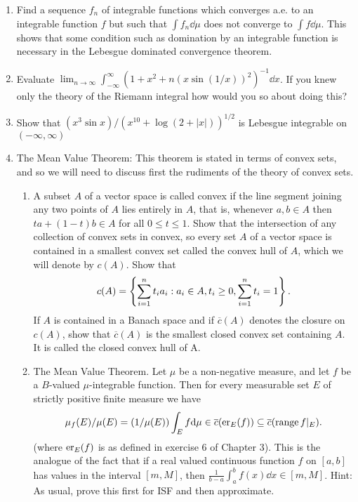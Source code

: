 \begin{enumerate}[label=\arabic*)]
\item Find a sequence $f_n$ of integrable functions which converges a.e. to an integrable function $f$ but such that $\int f_n\dd\mu$ does not converge to $\int f\dd\mu$. This shows that some condition such as domination by an integrable function is necessary in the Lebesgue dominated convergence theorem.

\item Evaluate $\lim_{n\to\infty}\int_{-\infty}^\infty(1+x^2+n(x\sin(1/x))^2)^{-1}\dd x$. If you knew only the theory of the Riemann integral how would you so about doing this?

\item Show that $(x^3 \sin x)/(x^{10}+\log(2+|x|))^{1/2}$ is Lebesgue integrable on $(-\infty,\infty)$

\item The Mean Value Theorem: This theorem is stated in terms of convex sets, and so we will need to discuss first the rudiments of the theory of convex sets.
\begin{enumerate}[label=\alph*)]
    \item A subset $A$ of a vector space is called convex if the line segment joining any two points of $A$ lies entirely in $A$, that is, whenever $a, b \in A$ then $ta+(1-t)b \in A$ for all $0\leq t\leq1$. Show that the intersection of any collection of convex sets in convex, so every set $A$ of a vector space is contained in a smallest convex set called the convex hull of $A$, which we will denote by $c(A)$. Show that $$c(A)=\brc{\sum_{i=1}^nt_ia_i:a_i \in A,t_i\geq0,\sum_{i=1}^nt_i=1}.$$ If $A$ is contained in a Banach space and if $\overline{c}(A)$ denotes the closure on $c(A)$, show that $\overline{c}(A)$ is the smallest closed convex set containing $A$. It is called the closed convex hull of A.
    
    \item The Mean Value Theorem. Let $\mu$ be a non-negative measure, and let $f$ be a $B$-valued $\mu$-integrable function. Then for every measurable set $E$ of strictly positive finite measure we have $$\mu_f(E)/\mu(E)=(1/\mu(E))\int_Ef\dd\mu\in\overline{c}(\er{f}{E})\subseteq\overline{c}(\operatorname{range}f|_E).$$ (where $\er{f}{E}$ is as defined in exercise 6 of Chapter 3). This is the analogue of the fact that if a real valued continuous function $f$ on $[a, b]$ has values in the interval $[m, M]$, then $\frac{1}{b-a}\int_a^b f(x)\dd x\in[m, M]$. Hint: As usual, prove this first for ISF and then approximate.
    

\end{enumerate}
\end{enumerate}
